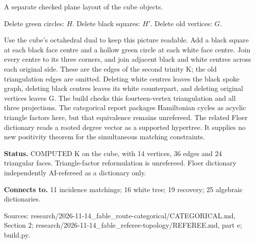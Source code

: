 \documentclass[10pt,a4paper]{amsart}
\begin{document}
\begin{center}
\begin{minipage}{.86\textwidth}
\par A separate checked plane layout of the cube objects.\par Delete green circles: $H$. Delete black squares: $H\prime$. Delete old vertices: $G$.
\end{minipage}\end{center}
Use the cube's octahedral dual to keep this picture readable. Add a black square at each black face centre and a hollow green circle at each white face centre. Join every centre to its three corners, and join adjacent black and white centres across each original side. These are the edges of the second trinity K; the old triangulation edges are omitted. Deleting white centres leaves the black spoke graph, deleting black centres leaves its white counterpart, and deleting original vertices leaves G. The build checks this fourteen-vertex triangulation and all three projections. The categorical report packages Hamiltonian cycles as acyclic triangle factors here, but that equivalence remains unrefereed. The related Floer dictionary reads a rooted degree vector as a supported hypertree. It supplies no new positivity theorem for the simultaneous matching constraints.

\textbf{Status.} COMPUTED K on the cube, with 14 vertices, 36 edges and 24 triangular faces. Triangle-factor reformulation is unrefereed. Floer dictionary independently AI-refereed as a dictionary only.

\textbf{Connects to.} 11 incidence matchings; 16 white tree; 19 recovery; 25 algebraic dictionaries.

{\footnotesize\raggedright Sources: research/\allowbreak{}2026-11-14\_fable\_route-categorical/\allowbreak{}CATEGORICAL.md, Section 2;\allowbreak{} research/\allowbreak{}2026-11-14\_fable\_referee-topology/\allowbreak{}REFEREE.md, part e;\allowbreak{} build.py.\par}
\end{document}
